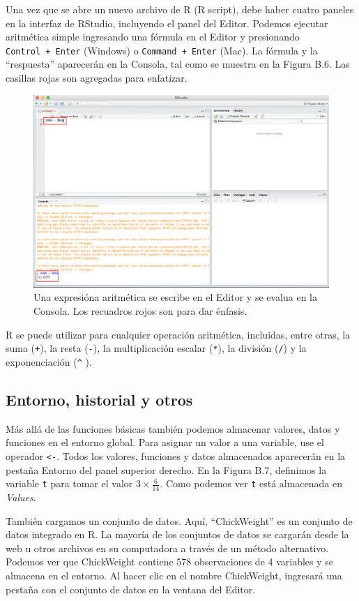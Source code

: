 \documentclass[12pt,spanish,]{book}
\begin{document}
Una vez que se abre un nuevo archivo de R (R script), debe haber cuatro paneles en la interfaz de RStudio, incluyendo el panel del Editor. Podemos ejecutar aritmética simple ingresando una fórmula en el Editor y presionando \texttt{Control\ +\ Enter} (Windows) o \texttt{Command\ +\ Enter} (Mac). La fórmula y la ``respuesta'' aparecerán en la Consola, tal como se muestra en la Figura B.6. Las casillas rojas son agregadas para enfatizar.

\begin{figure}
\includegraphics[width=0.6\linewidth]{Images/first_addition} \caption{Una expresióna aritmética se escribe en el Editor y se evalua en la Consola. Los recuadros rojos son para dar énfasis.}\label{fig:firstaddition}
\end{figure}

R se puede utilizar para cualquier operación aritmética, incluidas, entre otras, la suma (\texttt{+}), la resta (\texttt{-}), la multiplicación escalar (\texttt{*}), la división (\texttt{/}) y la exponenciación (\texttt{\^{}} ).

\hypertarget{entorno-historial-y-otros}{%
\subsection{Entorno, historial y otros}\label{entorno-historial-y-otros}}

Más allá de las funciones básicas también podemos almacenar valores, datos y funciones en el entorno global. Para asignar un valor a una variable, use el operador \texttt{\textless{}-}. Todos los valores, funciones y datos almacenados aparecerán en la pestaña Entorno del panel superior derecho. En la Figura B.7, definimos la variable \texttt{t} para tomar el valor \(3 \times \frac {6}{14}\). Como podemos ver \texttt{t} está almacenada en \emph{Values}.

También cargamos un conjunto de datos. Aquí, ``ChickWeight'' es un conjunto de datos integrado en R. La mayoría de los conjuntos de datos se cargarán desde la web u otros archivos en su computadora a través de un método alternativo. Podemos ver que ChickWeight contiene 578 observaciones de 4 variables y se almacena en el entorno. Al hacer clic en el nombre ChickWeight, ingresará una pestaña con el conjunto de datos en la ventana del Editor.
\end{document}
